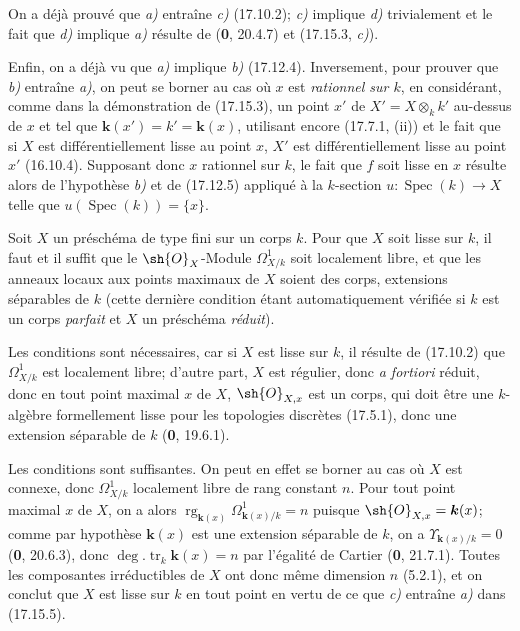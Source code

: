On a déjà prouvé que \emph{a)} entraîne \emph{c)} (17.10.2); \emph{c)} implique \emph{d)} trivialement et le fait que \emph{d)} implique \emph{a)} résulte de (\textbf{0}, 20.4.7) et (17.15.3, \emph{c)}).

Enfin, on a déjà vu que \emph{a)} implique \emph{b)} (17.12.4). Inversement, pour prouver que \emph{b)} entraîne \emph{a)}, on peut se borner au cas où $x$ est \emph{rationnel sur $k$}, en considérant, comme dans la démonstration de (17.15.3), un point $x'$ de $X'=X\otimes_k k'$ au-dessus de $x$ et tel que $\boldsymbol{k}(x')=k'=\boldsymbol{k}(x)$, utilisant encore (17.7.1, (ii)) et le fait que si $X$ est différentiellement lisse au point $x$, $X'$ est différentiellement lisse au point $x'$ (16.10.4). Supposant donc $x$ rationnel sur $k$, le fait que $f$ soit lisse en $x$ résulte alors de l'hypothèse \emph{b)} et de (17.12.5) appliqué à la $k$-section $u:\operatorname{Spec}(k)\to X$ telle que $u(\operatorname{Spec}(k))=\{x\}$.

\begin{corollary}[17.15.6]
\label{IV.17.15.6}
Soit $X$ un préschéma de type fini sur un corps $k$. Pour que $X$ soit lisse sur $k$, il faut et il suffit que le $\sh{O}_X$-Module $\varOmega^1_{X/k}$ soit localement libre, et que les anneaux locaux aux points maximaux de $X$ soient des corps, extensions séparables de $k$ \textup{(cette dernière condition étant automatiquement vérifiée si $k$ est un corps \emph{parfait} et $X$ un préschéma \emph{réduit})}.
\end{corollary}

Les conditions sont nécessaires, car si $X$ est lisse sur $k$, il résulte de (17.10.2) que $\varOmega^1_{X/k}$ est localement libre; d'autre part, $X$ est régulier, donc \emph{a fortiori} réduit, donc en tout point maximal $x$ de $X$, $\sh{O}_{X,x}$ est un corps, qui doit être une $k$-algèbre formellement lisse pour les topologies discrètes (17.5.1), donc une extension séparable de $k$ (\textbf{0}, 19.6.1).

Les conditions sont suffisantes. On peut en effet se borner au cas où $X$ est connexe, donc $\varOmega^1_{X/k}$ localement libre de rang constant $n$. Pour tout point maximal $x$ de $X$, on a alors $\operatorname{rg}_{\mathbf{k}(x)}\Omega^1_{\mathbf{k}(x)/k}=n$ puisque $\sh{O}_{X,x}=\boldsymbol{k}(x)$; comme par hypothèse $\boldsymbol{k}(x)$ est une extension séparable de $k$, on a $\Upsilon_{\mathbf{k}(x)/k}=0$ (\textbf{0}, 20.6.3), donc $\deg.\operatorname{tr}_k \boldsymbol{k}(x)=n$ par l'égalité de Cartier (\textbf{0}, 21.7.1). Toutes les composantes irréductibles de $X$ ont donc même dimension $n$ (5.2.1), et on conclut que $X$ est lisse sur $k$ en tout point en vertu de ce que \emph{c)} entraîne \emph{a)} dans (17.15.5).

